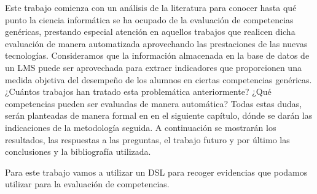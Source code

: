 
Este trabajo comienza con un análisis de la literatura para conocer hasta qué punto la ciencia informática se ha ocupado de la evaluación de competencias genéricas, prestando especial atención en aquellos trabajos que realicen dicha evaluación de manera automatizada aprovechando las prestaciones de las nuevas tecnologías. Consideramos que la información almacenada en la base de datos de un LMS puede ser aprovechada para extraer indicadores que proporcionen una medida objetiva del desempeño de los alumnos en ciertas competencias genéricas. ¿Cuántos trabajos han tratado esta problemática anteriormente? ¿Qué competencias pueden ser evaluadas de manera automática? Todas estas dudas, serán planteadas de manera formal en en el siguiente capítulo, dónde se darán las indicaciones de la metodología seguida. A continuación se mostrarán los resultados, las respuestas a las preguntas, el trabajo futuro y por último las conclusiones y la bibliografía utilizada.

Para este trabajo vamos a utilizar un DSL para recoger evidencias que podamos utilizar para la evaluación de competencias.








